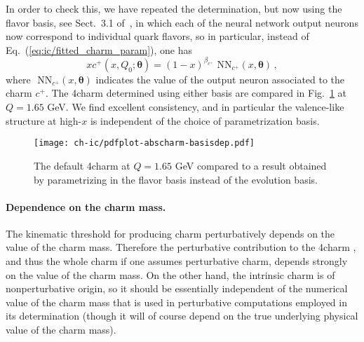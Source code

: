 In order to check this, we have repeated the \pdf determination, but
now using the flavor basis, see Sect.~3.1 of~\cite{Ball:2021leu}, in which
each of the  neural network output neurons now correspond to individual quark
flavors, so in particular,
instead of Eq.~(\ref{eq:ic/fitted_charm_param}),  one has
\begin{equation}
\label{eq:ic/fitted_charm_param_flavour}
xc^+(x,Q_0;{\boldsymbol \theta}) =
 (1-x)^{\beta_{c^+}} \textrm{ NN}_{c^+}(x,{\boldsymbol \theta}) \, ,
\end{equation}
where $\textrm{ NN}_{c^+}(x,{\boldsymbol \theta})$
indicates the value of the output neuron associated to the charm \pdf $c^+$.
%
The 4\fns charm \pdfs determined using either basis are compared 
in Fig.~\ref{fig:ic/charm_basisdep}  at $Q=1.65$ GeV.
%
We find excellent consistency, and in particular 
the valence-like structure at high-$x$ is independent of the choice
of parametrization basis.

\begin{figure}[t!]
  \begin{center}
    \texttt{[image: ch-ic/pdfplot-abscharm-basisdep.pdf]}
    \caption{\small The default 4\fns charm \pdf at $Q=1.65$ GeV
    compared to a result obtained by parametrizing \pdfs in the flavor
    basis instead of the evolution basis. 
  \label{fig:ic/charm_basisdep} }
\end{center}
\end{figure}

\paragraph{Dependence on the charm mass.}
%
The kinematic threshold for producing charm perturbatively depends on
the value of the charm mass. Therefore the perturbative contribution
to the 4\fns charm \pdf, and thus the whole charm \pdf if one assumes
perturbative charm, depends strongly on the value of the charm
mass.
On the other hand, the intrinsic charm \pdf is of nonperturbative
origin, so it should be essentially independent of the numerical value of the
charm mass that is used in  perturbative computations employed in  its 
determination (though it will of course depend on the true underlying 
physical value of the charm mass).

